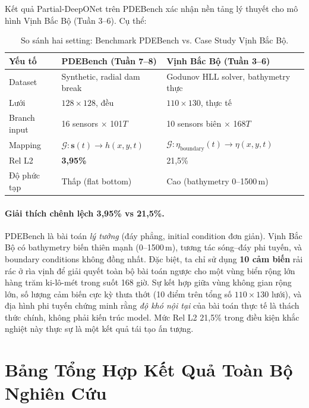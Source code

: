 \documentclass[12pt,a4paper]{article}
\begin{document}
Kết quả Partial-DeepONet trên PDEBench xác nhận nền tảng lý thuyết cho mô hình Vịnh Bắc Bộ (Tuần 3--6). Cụ thể:

\begin{table}[ht]
  \centering
  \caption{So sánh hai setting: Benchmark PDEBench vs. Case Study Vịnh Bắc Bộ.}
  \label{tab:compare}
  \begin{tabular}{@{}lll@{}}
    \toprule
    \textbf{Yếu tố} & \textbf{PDEBench (Tuần 7--8)} & \textbf{Vịnh Bắc Bộ (Tuần 3--6)} \\
    \midrule
    Dataset & Synthetic, radial dam break & Godunov HLL solver, bathymetry thực \\
    Lưới & $128 \times 128$, đều & $110 \times 130$, thực tế \\
    Branch input & 16 sensors $\times$ 101$T$ & 10 sensors biên $\times$ 168$T$ \\
    Mapping & $\mathcal{G}: \mathbf{s}(t) \to h(x,y,t)$ & $\mathcal{G}: \eta_{\text{boundary}}(t) \to \eta(x,y,t)$ \\
    Rel L2 & \textbf{3,95\%} & 21,5\% \\
    Độ phức tạp & Thấp (flat bottom) & Cao (bathymetry 0--1500\,m) \\
    \bottomrule
  \end{tabular}
\end{table}

\paragraph{Giải thích chênh lệch 3,95\% vs 21,5\%.}
PDEBench là bài toán \emph{lý tưởng} (đáy phẳng, initial condition đơn giản). Vịnh Bắc Bộ có bathymetry biến thiên mạnh (0--1500\,m), tương tác sóng--đáy phi tuyến, và boundary conditions không đồng nhất. Đặc biệt, ta chỉ sử dụng \textbf{10 cảm biến} rải rác ở rìa vịnh để giải quyết toàn bộ bài toán ngược cho một vùng biển rộng lớn hàng trăm ki-lô-mét trong suốt 168 giờ. Sự kết hợp giữa vùng không gian rộng lớn, số lượng cảm biến cực kỳ thưa thớt (10 điểm trên tổng số $110 \times 130$ lưới), và địa hình phi tuyến chứng minh rằng \emph{độ khó nội tại} của bài toán thực tế là thách thức chính, không phải kiến trúc model. Mức Rel L2 21,5\% trong điều kiện khắc nghiệt này thực sự là một kết quả tái tạo ấn tượng.

\section{Bảng Tổng Hợp Kết Quả Toàn Bộ Nghiên Cứu}
\end{document}
